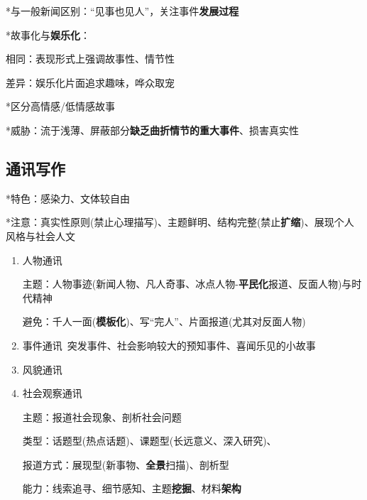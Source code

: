 \documentclass[a4paper,UTF8]{ctexart}
\begin{document}
*与一般新闻区别：“见事也见人”，关注事件\textbf{发展过程}

*故事化与\textbf{娱乐化}：

相同：表现形式上强调故事性、情节性

差异：娱乐化片面追求趣味，哗众取宠

*区分高情感/低情感故事

*威胁：流于浅薄、屏蔽部分\textbf{缺乏曲折情节的重大事件}、损害真实性

\subsection{通讯写作}
*特色：感染力、文体较自由

*注意：真实性原则(禁止心理描写)、主题鲜明、结构完整(禁止\textbf{扩缩})、展现个人风格与社会人文

\begin{enumerate}
	\item 人物通讯
	
	主题：人物事迹(新闻人物、凡人奇事、冰点人物-\textbf{平民化}报道、反面人物)与时代精神
	
	避免：千人一面(\textbf{模板化})、写“完人”、片面报道(尤其对反面人物)
	
	\item 事件通讯\ 突发事件、社会影响较大的预知事件、喜闻乐见的小故事
	
	\item 风貌通讯
	
	\item 社会观察通讯
	
	主题：报道社会现象、剖析社会问题
	
	类型：话题型(热点话题)、课题型(长远意义、深入研究)、
	
	报道方式：展现型(新事物、\textbf{全景}扫描)、剖析型
	
	能力：线索追寻、细节感知、主题\textbf{挖掘}、材料\textbf{架构}
\end{enumerate}
\end{document}
